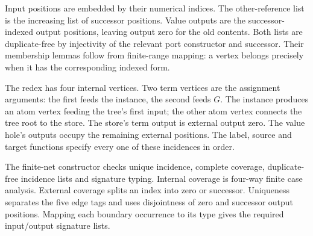 





Input positions are embedded by their numerical indices. The other-reference
list is the increasing list of successor positions. Value outputs are the
successor-indexed output positions, leaving output zero for the old contents.
Both lists are duplicate-free by injectivity of the relevant port constructor
and successor. Their membership lemmas follow from finite-range mapping:
a vertex belongs precisely when it has the corresponding indexed form.









The redex has four internal vertices. Two term vertices are the assignment
arguments: the first feeds the instance, the second feeds $G$. The instance
produces an atom vertex feeding the tree's first input; the other atom
vertex connects the tree root to the store. The store's term output is
external output zero. The value hole's outputs occupy the remaining
external positions. The label, source and target functions specify every
one of these incidences in order.

The finite-net constructor checks unique incidence, complete coverage,
duplicate-free incidence lists and signature typing. Internal coverage is
four-way finite case analysis. External coverage splits an index into zero
or successor. Uniqueness separates the five edge tags and uses disjointness
of zero and successor output positions. Mapping each boundary occurrence
to its type gives the required input/output signature lists.

